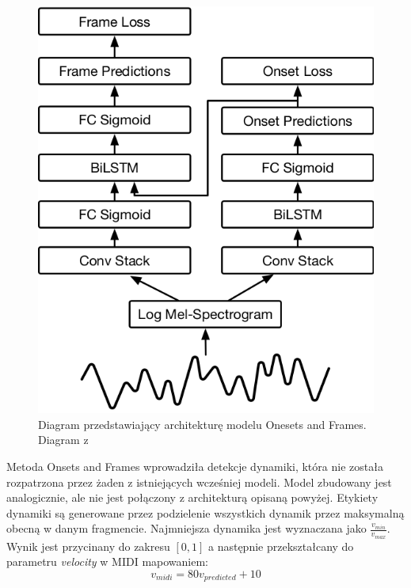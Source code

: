 \documentclass[12pt,a4paper,twoside]{mwart}
\begin{document}
\begin{figure}[H]
  \begin{center}
    \includegraphics[scale=0.6]{images/architekturaSieciOnesetsFrames.png}
    \caption{Diagram przedstawiający architekturę modelu Onesets and Frames. Diagram z \cite{Transcription:OnsetsAndFrames:Blog}}
    \label{fig:onsetsAndFramesArch}%
  \end{center}
\end{figure}

Metoda Onsets and Frames wprowadziła detekcje dynamiki, która nie została rozpatrzona przez żaden z istniejących wcześniej modeli. Model zbudowany jest analogicznie, ale nie jest połączony z architekturą opisaną powyżej. Etykiety dynamiki są generowane przez podzielenie wszystkich dynamik przez maksymalną obecną w danym fragmencie. Najmniejsza dynamika jest wyznaczana jako $\frac{v_{min}}{v_{max}}$. Wynik jest przycinany do zakresu $\left[0,1\right]$ a następnie przekształcany do parametru \textit{velocity} w MIDI mapowaniem:
\begin{equation}
  v_{midi} = 80 v_{predicted} + 10
\end{equation}
\end{document}
